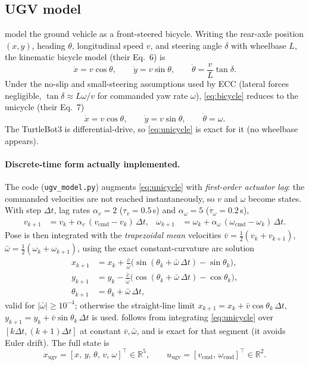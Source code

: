 \documentclass[11pt]{article}
\newcommand{\R}{\mathbb{R}}
\newcommand{\code}[1]{\texttt{#1}}
\begin{document}
\subsection{UGV model}
\citet{ferreira2024aerial} model the ground vehicle as a front-steered bicycle. Writing the rear-axle
position $(x,y)$, heading $\theta$, longitudinal speed $v$, and steering angle $\delta$ with wheelbase $L$,
the kinematic bicycle model (their Eq.~6) is
\begin{equation}
\dot x = v\cos\theta,\qquad \dot y = v\sin\theta,\qquad \dot\theta = \frac{v}{L}\tan\delta .
\label{eq:bicycle}
\end{equation}
Under the no-slip and small-steering assumptions used by ECC (lateral forces negligible, $\tan\delta\approx
L\omega/v$ for commanded yaw rate $\omega$), \cref{eq:bicycle} reduces to the unicycle (their Eq.~7)
\begin{equation}
\dot x = v\cos\theta,\qquad \dot y = v\sin\theta,\qquad \dot\theta = \omega .
\label{eq:unicycle}
\end{equation}
The TurtleBot3 is differential-drive, so \cref{eq:unicycle} is exact for it (no wheelbase appears).

\paragraph{Discrete-time form actually implemented.}
The code (\code{ugv\_model.py}) augments \cref{eq:unicycle} with \emph{first-order actuator lag}: the
commanded velocities are not reached instantaneously, so $v$ and $\omega$ become states. With step
$\Delta t$, lag rates $\alpha_v=2$ ($\tau_v=0.5$\,s) and $\alpha_\omega=5$ ($\tau_\omega=0.2$\,s),
\begin{align}
v_{k+1} &= v_k + \alpha_v\,(v_{\text{cmd}}-v_k)\,\Delta t, &
\omega_{k+1} &= \omega_k + \alpha_\omega\,(\omega_{\text{cmd}}-\omega_k)\,\Delta t .
\label{eq:lag}
\end{align}
Pose is then integrated with the \emph{trapezoidal mean} velocities
$\bar v=\tfrac12(v_k+v_{k+1})$, $\bar\omega=\tfrac12(\omega_k+\omega_{k+1})$, using the exact
constant-curvature arc solution
\begin{equation}
\boxed{\;
\begin{aligned}
x_{k+1} &= x_k + \frac{\bar v}{\bar\omega}\bigl(\sin(\theta_k+\bar\omega\,\Delta t)-\sin\theta_k\bigr),\\
y_{k+1} &= y_k - \frac{\bar v}{\bar\omega}\bigl(\cos(\theta_k+\bar\omega\,\Delta t)-\cos\theta_k\bigr),\\
\theta_{k+1} &= \theta_k + \bar\omega\,\Delta t,
\end{aligned}\;}
\label{eq:ugv_disc}
\end{equation}
valid for $|\bar\omega|\ge10^{-4}$; otherwise the straight-line limit
$x_{k+1}=x_k+\bar v\cos\theta_k\,\Delta t$, $y_{k+1}=y_k+\bar v\sin\theta_k\,\Delta t$ is used.
 follows from integrating \cref{eq:unicycle} over $[k\Delta t,(k{+}1)\Delta t]$ at
constant $\bar v,\bar\omega$, and is exact for that segment (it avoids Euler drift). The full state is
\[
x_{\text{ugv}} = [x,\,y,\,\theta,\,v,\,\omega]^\top \in\R^5, \qquad
u_{\text{ugv}} = [v_{\text{cmd}},\,\omega_{\text{cmd}}]^\top \in\R^2 .
\]
\end{document}
